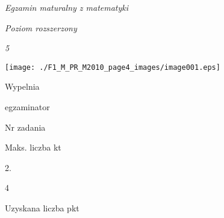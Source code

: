 \documentclass[a4paper,12pt]{article}
\begin{document}
{\it Egzamin maturalny z matematyki}

{\it Poziom rozszerzony}

{\it 5}
\begin{center}
\texttt{[image: ./F1\_M\_PR\_M2010\_page4\_images/image001.eps]}
\end{center}
Wypelnia

egzaminator

Nr zadania

Maks. liczba kt

2.

4

Uzyskana liczba pkt
\end{document}
